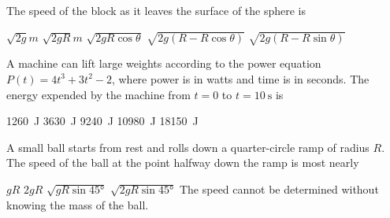 \documentclass{../../../oss-classkick-exam}
\begin{document}
\begin{multicols*}{2}
\begin{questions}
    \question The speed of the block as it leaves the surface of the sphere is
    \label{sphere2}
    \begin{choices}
      \choice $\displaystyle\sqrt{2g}{m}$
      \choice $\displaystyle\sqrt{2gR}{m}$
      \choice $\displaystyle\sqrt{2gR\cos\theta}$
      \choice $\displaystyle\sqrt{2g(R-R\cos\theta)}$
      \choice $\displaystyle\sqrt{2g(R-R\sin\theta)}$
    \end{choices}
    
  \item A machine can lift large weights according to the power equation
    $P(t)=4t^3+3t^2-2$, where power is in watts and time is in seconds. The
    energy expended by the machine from $t=0$ to $t=\SI{10}{\second}$ is
    \begin{choices}
      \choice \SI{1260}{\joule}
      \choice \SI{3630}{\joule}
      \choice \SI{9240}{\joule}
      \choice \SI{10980}{\joule}
      \choice \SI{18150}{\joule}
    \end{choices}
    
    \question A small ball starts from rest and rolls down a quarter-circle
    ramp of radius $R$. The speed of the ball at the point halfway down the
    ramp is most nearly
    \begin{center}
    \end{center}
    \begin{choices}
      \choice $gR$
      \choice $2gR$
      \choice $\displaystyle\sqrt{gR\sin\ang{45}}$
      \choice $\displaystyle\sqrt{2gR\sin\ang{45}}$
      \choice The speed cannot be determined without knowing the mass of the
      ball.
    \end{choices}
  \end{questions}
\end{multicols*}
\newpage


\genfreedirections
\end{document}
